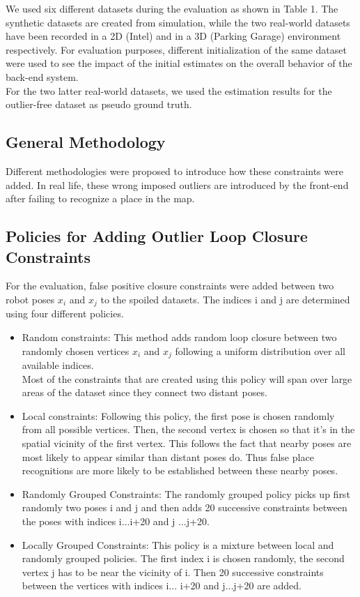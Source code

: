 \documentclass[9pt,technote]{IEEEtran}
\begin{document}

We used six different datasets during the evaluation as shown in Table 1. The synthetic datasets are created from simulation, while the two real-world datasets have been recorded in a 2D (Intel) and in a 3D (Parking Garage) environment respectively. For evaluation purposes, different initialization of the same dataset were used to see the impact of the initial estimates on the overall behavior of the back-end system.\\
For the two latter real-world datasets, we used the estimation results for the outlier-free dataset as pseudo ground truth.
\subsection{General Methodology} 
Different methodologies were proposed to introduce how these constraints were added. In real life, these wrong imposed outliers are introduced by the front-end after failing to recognize a place in the map.
\subsection{Policies for Adding Outlier Loop Closure Constraints}
For the evaluation, false positive closure constraints were added between two robot poses $x_{i}$ and $x_{j}$ to the spoiled datasets. The indices i and j are determined using four different policies.
\begin{itemize}
\item Random constraints:
This method adds random loop closure between two randomly chosen vertices $x_{i}$ and $x_{j}$ following a uniform distribution over all available indices.\\
Most of the constraints that are created using this policy will span over large areas of the dataset since they connect two distant poses.
\item Local constraints:
Following this policy, the first pose is chosen randomly from all possible vertices. Then, the second vertex is chosen so that it's in the spatial vicinity of the first vertex.
This follows the fact that nearby poses are most likely to appear similar than distant poses do. Thus false place recognitions are more likely to be established
between these nearby poses.
\item Randomly Grouped Constraints:
The randomly grouped policy picks up first randomly two poses i and j and then adds 20 successive constraints between the poses with indices i...i+20 and j ...j+20. 
\item Locally Grouped Constraints:
This policy is a mixture between local and randomly grouped policies. 
The first index i is chosen randomly, the second vertex j has to be near the vicinity of i. Then 20 successive constraints
between the vertices with indices i... i+20 and j...j+20 are added.  
\end{itemize}
\end{document}
